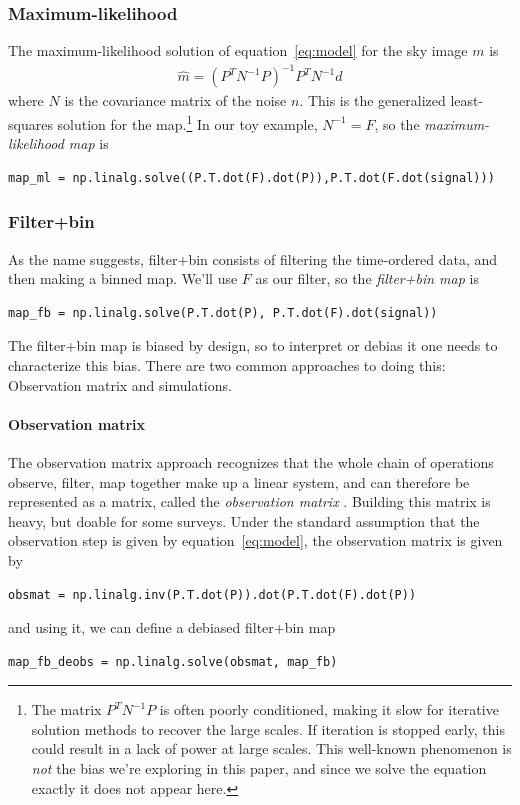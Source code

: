 \documentclass{aa}
\begin{document}
\subsubsection{Maximum-likelihood}
The maximum-likelihood solution of equation~\ref{eq:model} for the
sky image $m$ is
\begin{align}
	\hat m = (P^TN^{-1}P)^{-1}P^TN^{-1}d
\end{align}
where $N$ is the covariance matrix of the noise $n$. This is the
generalized least-squares solution for the map.\footnote{
	The matrix $P^TN^{-1}P$ is often poorly conditioned, making it slow
	for iterative solution methods to recover the large scales. If iteration is
	stopped early, this could result in a lack of power at large scales.
	This well-known phenomenon is \emph{not} the bias we're exploring in
	this paper, and since we solve the equation exactly it does not
	appear here.
}
In our toy example, $N^{-1} = F$, so the \emph{maximum-likelihood map}
is
\begin{lstlisting}
map_ml = np.linalg.solve((P.T.dot(F).dot(P)),P.T.dot(F.dot(signal)))
\end{lstlisting}

\subsubsection{Filter+bin}
As the name suggests, filter+bin consists of filtering the time-ordered
data, and then making a binned map. We'll use $F$ as our filter, so
the \emph{filter+bin map} is
\begin{lstlisting}
map_fb = np.linalg.solve(P.T.dot(P), P.T.dot(F).dot(signal))
\end{lstlisting}
The filter+bin map is biased by design, so to interpret or debias it one
needs to characterize this bias. There are two common approaches
to doing this: Observation matrix and simulations.

\paragraph{Observation matrix}
The observation matrix approach
recognizes that the whole chain of operations observe, filter, map
together make up a linear system, and can therefore be represented
as a matrix, called the \emph{observation matrix} \citep{bicep2-obsmat}.
Building this matrix is heavy, but doable for some
surveys. Under the standard assumption that the observation step is
given by equation~\ref{eq:model}, the observation matrix is given by
\begin{lstlisting}
obsmat = np.linalg.inv(P.T.dot(P)).dot(P.T.dot(F).dot(P))
\end{lstlisting}
and using it, we can define a debiased filter+bin map
\begin{lstlisting}
map_fb_deobs = np.linalg.solve(obsmat, map_fb)
\end{lstlisting}
\end{document}
